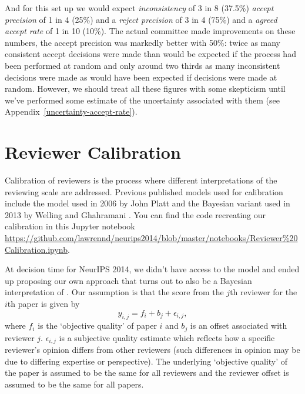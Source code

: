 And for this set up we would expect \emph{inconsistency} of 3 in 8
(37.5\%) \emph{accept precision} of 1 in 4 (25\%) and a \emph{reject
precision} of 3 in 4 (75\%) and a \emph{agreed accept rate} of 1 in 10
(10\%). The actual committee made improvements on these numbers, the
accept precision was markedly better with 50\%: twice as many consistent
accept decisions were made than would be expected if the process had
been performed at random and only around two thirds as many inconsistent
decisions were made as would have been expected if decisions were made
at random. However, we should treat all these figures with some
skepticism until we've performed some estimate of the uncertainty
associated with them (see Appendix~\ref{uncertainty-accept-rate}).



\section{Reviewer Calibration}
\label{app:reviewer-calibration}

Calibration of reviewers is the process where different interpretations
of the reviewing scale are addressed. Previous published models used for calibration include the model used in 2006 by John Platt \citep{Platt-calibration12} and the Bayesian variant used in 2013 by Welling and Ghahramani \cite{Ge-bayesian15}. You can find the code recreating our calibration in this Jupyter notebook \url{https://github.com/lawrennd/neurips2014/blob/master/notebooks/Reviewer%20Calibration.ipynb}.

At decision time for NeurIPS 2014, we didn't have access to the \cite{Ge-bayesian15} model and ended up proposing our own approach that turns out to also be a Bayesian interpretation of \cite{Platt-calibration12}. Our assumption is
that the score from the \(j\)th reviewer for the \(i\)th paper is given
by \[
y_{i,j} = f_i + b_j + \epsilon_{i, j},
\] 
where \(f_i\) is the `objective quality' of paper \(i\) and \(b_j\)
is an offset associated with reviewer \(j\). \(\epsilon_{i,j}\) is a
subjective quality estimate which reflects how a specific reviewer's
opinion differs from other reviewers (such differences in opinion may be
due to differing expertise or perspective). The underlying `objective
quality' of the paper is assumed to be the same for all reviewers and
the reviewer offset is assumed to be the same for all papers.

